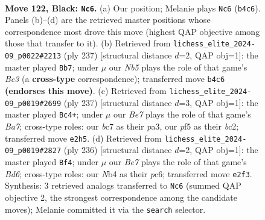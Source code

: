 \documentclass[11pt]{article}
\begin{document}
\clearpage

\begin{figure}[p]\centering
\begin{subfigure}{0.46\textwidth}\centering
\resizebox{\linewidth}{!}{%
\newchessgame
\chessboard[
  setfen={6k1/2B5/7K/5P2/1n6/8/4b3/8 b - - 2 122},
  showmover=false,
  pgfstyle=straightmove, color=movearrow, markmove={b4-c6}
]}
\caption{}
\end{subfigure}\hfill
\begin{subfigure}{0.46\textwidth}\centering
\resizebox{\linewidth}{!}{%
\newchessgame
\chessboard[
  setfen={5B2/8/1Pb5/8/8/2K5/8/1k6 b - - 66 119},
  showmover=false,
  pgfstyle=straightmove, color=movearrow, markmove={c6-b7}
]}
\caption{}
\end{subfigure}
\\[4pt]
\begin{subfigure}{0.46\textwidth}\centering
\resizebox{\linewidth}{!}{%
\newchessgame
\chessboard[
  setfen={8/8/8/1K6/3k4/P7/b1B5/8 b - - 60 119},
  showmover=false,
  pgfstyle=straightmove, color=movearrow, markmove={a2-c4}
]}
\caption{}
\end{subfigure}\hfill
\begin{subfigure}{0.46\textwidth}\centering
\resizebox{\linewidth}{!}{%
\newchessgame
\chessboard[
  setfen={8/7k/2pB1K2/8/2bp4/8/8/8 w - - 0 119},
  showmover=false,
  pgfstyle=straightmove, color=movearrow, markmove={d6-f4}
]}
\caption{}
\end{subfigure}
\caption{\textbf{Move 122, Black: \texttt{Nc6}.} (a) Our position; Melanie plays \texttt{Nc6} (\texttt{b4c6}). Panels (b)--(d) are the retrieved master positions whose correspondence most drove this move (highest QAP objective among those that transfer to it). (b) Retrieved from \texttt{lichess\_elite\_2024-09\_p0022\#2213} (ply 237) [structural distance $d$=2, QAP obj=1]: the master played \texttt{Bb7}; under $\mu$ our \emph{Nb5} plays the role of that game's \emph{Bc3} (a \textbf{cross-type} correspondence); transferred move \texttt{b4c6} \textbf{(endorses this move)}. (c) Retrieved from \texttt{lichess\_elite\_2024-09\_p0019\#2699} (ply 237) [structural distance $d$=3, QAP obj=1]: the master played \texttt{Bc4+}; under $\mu$ our \emph{Be7} plays the role of that game's \emph{Ba7}; cross-type roles: our \emph{b}c7 as their \emph{p}a3, our \emph{p}f5 as their \emph{b}c2; transferred move \texttt{e2h5}. (d) Retrieved from \texttt{lichess\_elite\_2024-09\_p0019\#2827} (ply 236) [structural distance $d$=2, QAP obj=1]: the master played \texttt{Bf4}; under $\mu$ our \emph{Be7} plays the role of that game's \emph{Bd6}; cross-type roles: our \emph{N}b4 as their \emph{p}c6; transferred move \texttt{e2f3}. Synthesis: 3 retrieved analogs transferred to \texttt{Nc6} (summed QAP objective 2, the strongest correspondence among the candidate moves); Melanie committed it via the \texttt{search} selector.}
\label{fig:thought-m243}
\end{figure}
\end{document}
